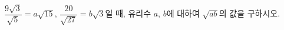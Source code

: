 $\dfrac{9\sqrt{3}}{\sqrt{5}}=a\sqrt{15}$, $\dfrac{20}{\sqrt{27}}=b\sqrt{3}$일 때, 유리수 $a$, $b$에 대하여 $\sqrt{ab}$의 값을 구하시오.

